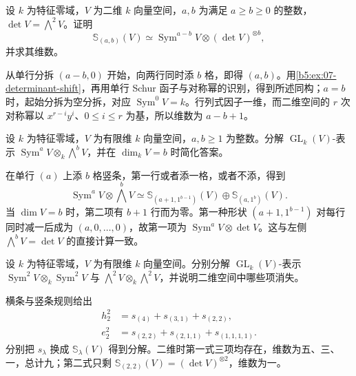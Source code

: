\begin{exercise}\label{b5:ex:07-gl2}
	设 \(k\) 为特征零域，\(V\) 为二维 \(k\) 向量空间，\(a,b\) 为满足 \(a\ge b\ge0\) 的整数，\(\det V=\bigwedge^2V\)。证明
	\[
		\mathbb S_{(a,b)}(V)\simeq \operatorname{Sym}^{a-b}V\otimes(\det V)^{\otimes b},
	\]
	并求其维数。
\end{exercise}
\begin{solution}
	从单行分拆 \((a-b,0)\) 开始，向两行同时添 \(b\) 格，即得 \((a,b)\)。用\cref{b5:ex:07-determinant-shift}，再用单行 Schur 函子与对称幂的识别，得到所述同构；\(a=b\) 时，起始分拆为空分拆，对应 \(\operatorname{Sym}^0V=k\)。行列式因子一维，而二维空间的 \(r\) 次对称幂以 \(x^{r-i}y^i\)、\(0\le i\le r\) 为基，所以维数为 \(a-b+1\)。
\end{solution}

\begin{exercise}\label{b5:ex:07-symmetric-exterior-product}
	设 \(k\) 为特征零域，\(V\) 为有限维 \(k\) 向量空间，\(a,b\ge1\) 为整数。分解 \(\operatorname{GL}_k(V)\)-表示 \(\operatorname{Sym}^aV\otimes_k\bigwedge^bV\)，并在 \(\dim_kV=b\) 时简化答案。
\end{exercise}
\begin{solution}
	在单行 \((a)\) 上添 \(b\) 格竖条，第一行或者添一格，或者不添，得到
	\[
		\operatorname{Sym}^aV\otimes\bigwedge^bV \simeq\mathbb S_{(a+1,1^{b-1})}(V) \oplus\mathbb S_{(a,1^b)}(V).
	\]
	当 \(\dim V=b\) 时，第二项有 \(b+1\) 行而为零。第一种形状 \((a+1,1^{b-1})\) 对每行同时减一后成为 \((a,0,\ldots,0)\)，故第一项为 \(\operatorname{Sym}^{a}V\otimes\det V\)。这与左侧 \(\bigwedge^bV=\det V\) 的直接计算一致。
\end{solution}

\begin{exercise}\label{b5:ex:07-square-symmetric-exterior}
	设 \(k\) 为特征零域，\(V\) 为有限维 \(k\) 向量空间。分别分解 \(\operatorname{GL}_k(V)\)-表示 \(\operatorname{Sym}^2V\otimes_k\operatorname{Sym}^2V\) 与 \(\bigwedge^2V\otimes_k\bigwedge^2V\)，并说明二维空间中哪些项消失。
\end{exercise}
\begin{solution}
	横条与竖条规则给出
	\begin{align*}
		h_2^2&=s_{(4)}+s_{(3,1)}+s_{(2,2)},\\
		e_2^2&=s_{(2,2)}+s_{(2,1,1)}+s_{(1,1,1,1)}.
	\end{align*}
	分别把 \(s_\lambda\) 换成 \(\mathbb S_\lambda(V)\) 得到分解。二维时第一式三项均存在，维数为五、三、一，总计九；第二式只剩 \(\mathbb S_{(2,2)}(V)=(\det V)^{\otimes2}\)，维数为一。
\end{solution}

